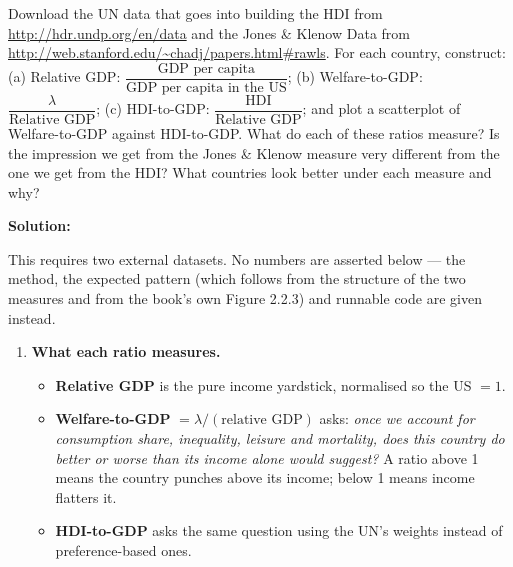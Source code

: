 \documentclass[12pt, letterpaper]{article}
\begin{document}
\begin{tcolorbox}[oddbox,title={Problem 2.1 \quad Comparing the HDI and the Jones \& Klenow Welfare Measure}]
\begin{tcolorbox}[questionbox]
Download the UN data that goes into building the HDI from
\url{http://hdr.undp.org/en/data} and the Jones \& Klenow Data from
\url{http://web.stanford.edu/~chadj/papers.html\#rawls}. For each country, construct:
(a) Relative GDP: $\dfrac{\text{GDP per capita}}{\text{GDP per capita in the US}}$;
(b) Welfare-to-GDP: $\dfrac{\lambda}{\text{Relative GDP}}$;
(c) HDI-to-GDP: $\dfrac{\text{HDI}}{\text{Relative GDP}}$;
and plot a scatterplot of Welfare-to-GDP against HDI-to-GDP. What do each of these ratios
measure? Is the impression we get from the Jones \& Klenow measure very different from the
one we get from the HDI? What countries look better under each measure and why?
\end{tcolorbox}

\textbf{Solution:}

\begin{tcolorbox}[databox]
This requires two external datasets. No numbers are asserted below --- the method, the
expected pattern (which follows from the structure of the two measures and from the book's
own Figure 2.2.3) and runnable code are given instead.
\end{tcolorbox}

\begin{enumerate}

\item \textbf{What each ratio measures.}

\begin{itemize}[leftmargin=1.3em,itemsep=3pt,topsep=2pt]
\item \textbf{Relative GDP} is the pure income yardstick, normalised so the US $=1$.
\item \textbf{Welfare-to-GDP} $=\lambda/(\text{relative GDP})$ asks: \emph{once we account
for consumption share, inequality, leisure and mortality, does this country do better
or worse than its income alone would suggest?} A ratio above 1 means the country
punches above its income; below 1 means income flatters it.
\item \textbf{HDI-to-GDP} asks the same question using the UN's weights instead of
preference-based ones.
\end{itemize}


\end{enumerate}
\end{tcolorbox}
\end{document}
